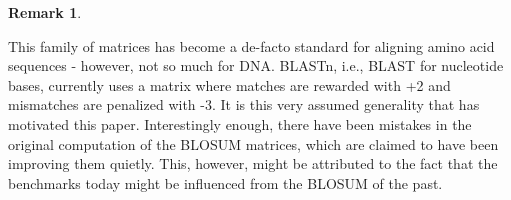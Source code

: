 \documentclass{article}
\newtheorem{remark}{Remark}
\begin{document}
\begin{multicols}{2}
\begin{remark}
	\end{remark}

This family of matrices has become a de-facto standard for aligning amino acid
sequences - however, not so much for DNA. BLASTn, i.e., BLAST for nucleotide bases, currently uses a matrix where
matches are rewarded with +2 and mismatches are penalized with -3. It is this very assumed generality that has motivated this paper.
Interestingly enough, there have been
mistakes in the original computation of the BLOSUM matrices, which are claimed
to have been improving them quietly. This, however, might be attributed to the
fact that the benchmarks today might be influenced from the BLOSUM of the past.

\end{multicols}
\end{document}
